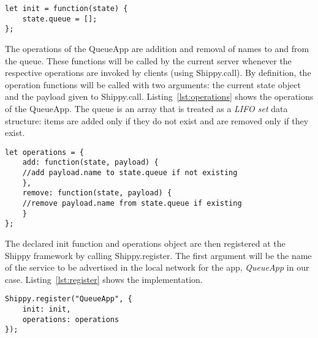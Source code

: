 \begin{lstlisting}[caption={QueueApp init function},label={lst:init}]
let init = function(state) {
    state.queue = [];
};
\end{lstlisting}

The operations of the QueueApp are addition and removal of names to and from the queue. These functions will be called by the current server whenever the respective operations are invoked by clients (using {\ttfamily Shippy.call}). By definition, the operation functions will be called with two arguments: the current {\ttfamily state} object and the  {\ttfamily payload} given to {\ttfamily Shippy.call}. Listing~\ref{lst:operations} shows the operations of the QueueApp. The queue is an array that is treated as a \textit{LIFO set} data structure: items are added only if they do not exist and are removed only if they exist.

\begin{lstlisting}[caption={QueueApp operations},label={lst:operations}]
let operations = {
    add: function(state, payload) {
    //add payload.name to state.queue if not existing
    },
    remove: function(state, payload) {
    //remove payload.name from state.queue if existing
    }
};
\end{lstlisting}

The declared {\ttfamily init} function and {\ttfamily operations} object are then registered at the Shippy framework by calling {\ttfamily Shippy.register}. The first argument will be the name of the service to be advertised in the local network for the app, \textit{QueueApp} in our case. Listing~\ref{lst:register} shows the implementation.

\begin{lstlisting}[caption={Call to Shippy.register},label={lst:register}]
Shippy.register("QueueApp", {
    init: init,
    operations: operations
});
\end{lstlisting}